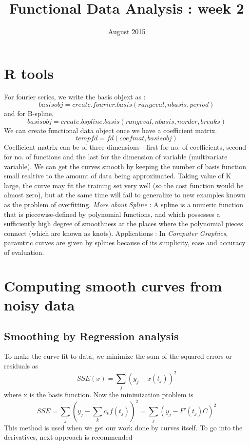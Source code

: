 \documentclass{article}
\title{Functional Data Analysis : week 2}
\date{August 2015}
\begin{document}
\maketitle

\section{R tools}
For fourier series, we write the basis objext as :
\[ basisobj = create.fourier.basis(rangeval, nbasis,period)\]
and for B-spline,
\[  basisobj = create.bspline.basis(rangeval, nbasis,norder, breaks) \]
We can create functional data object once we have a coefficient matrix. 
\[ tempfd = fd(coefmat, basisobj)\]
Coefficient matrix can be of three dimensions - first for no. of coefficients, second for no. of functions and the last for the dimension of variable (multivariate variable).   \newline
We can get the curves smooth by keeping the number of basis function small realtive to the amount of data being approximated. Taking value of K large, the curve may fit the training set very well (so the cost function would be almost zero), but at the same time will fail to generalize to new examples known as the problem of overfitting. \newline
\textit{ More about Spline }: A spline is a numeric function that is piecewise-defined by polynomial functions, and which possesses a sufficiently high degree of smoothness at the places where the polynomial pieces connect (which are known as knots). Applications : In \textit{Computer Graphics}, paramtric curves are given by splines because of its simplicity, ease and accuracy of evaluation. 
\section{Computing smooth curves from noisy data}
\subsection{Smoothing by Regression analysis}
To make the curve fit to data, we minimize the sum of the squared errors or residuals as \[ SSE(x) = \sum_j (y_j - x(t_j))^2 \] where x is the basis function. Now the minimization problem is \[SSE = \sum_j (y_j-\sum_{k} c_k f(t_j))^2  = \sum_j(y_j - F'(t_j)C)^2\]
This method is used when we get our work done by curves itself. To go into the derivatives, next approach is recommended
\end{document}
